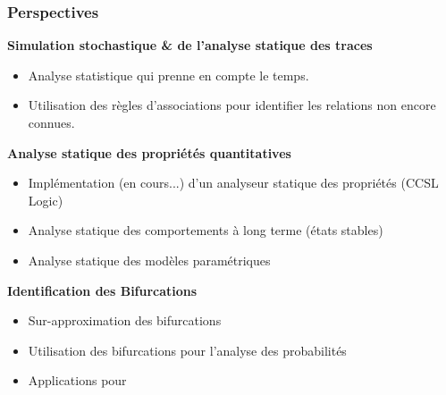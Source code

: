 \begin{frame}
 \frametitle{Perspectives}
 \pause
 \textbf{Simulation stochastique \& de l'analyse statique des traces}
 \begin{itemize}
  \item Analyse statistique qui prenne en compte le temps.
  \item Utilisation des règles d'associations pour identifier les relations non encore connues.
 \end{itemize}

 \pause
 \textbf{Analyse statique des propriétés quantitatives}
 \begin{itemize}
  \item Implémentation (en cours...) d'un analyseur statique des propriétés (CCSL Logic)
  \item Analyse statique des comportements à long terme (états stables)
  \item Analyse statique des modèles paramétriques
 \end{itemize}

 \pause
 \textbf{Identification des Bifurcations}
 \begin{itemize}
  \item Sur-approximation des bifurcations
  \item Utilisation des bifurcations pour l'analyse des probabilités 
  \item Applications pour 
  
 \end{itemize}

 
 
% 
%  
% 
 
\end{frame}

